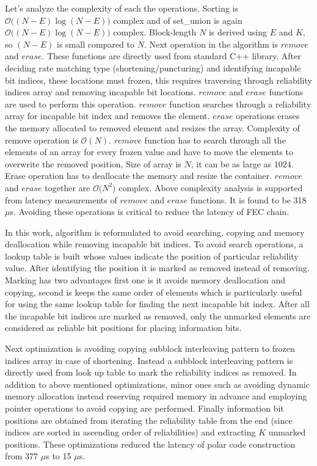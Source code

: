Let's analyze the complexity of each the operations. Sorting is $\mathcal{O}\big((N-E)\log{}(N-E)\big)$ complex and of set\_union is again $\mathcal{O}\big((N-E)\log{}(N-E)\big)$ complex. Block-length $N$ is derived using $E$ and $K$, so $(N-E)$ is small compared to $N$. Next operation in the algorithm is $remove$ and $erase$. These functions are directly used from standard C++ library. After deciding rate matching type (shortening/puncturing) and identifying incapable bit indices, these locations must frozen, this requires traversing through reliability indices array and removing incapable bit locations. $remove$ and $erase$ functions are used to perform this operation. $remove$ function searches through a reliability array for incapable bit index and removes the element. $erase$ operations erases the memory allocated to removed element and resizes the array. Complexity of remove operation is $\mathcal{O}(N)$. $remove$ function has to search through all the elements of an array for every frozen value and have to move the elements to overwrite the removed position, Size of array is $N$, it can be as large as $1024$. Erase operation has to deallocate the memory and resize the container. $remove$ and $erase$ together are $\mathcal{O}\big(N^2\big)$ complex. Above complexity analysis is supported from latency measurements of $remove$ and $erase$ functions. It is found to be 318 $\mu$s. Avoiding these operations is critical to reduce the latency of FEC chain. \newline

In this work, algorithm is reformulated to avoid searching, copying and memory deallocation while removing incapable bit indices. To avoid search operations, a lookup table is built whose values indicate the position of particular reliability value. After identifying the position it is marked as removed instead of removing. Marking has two advantages first one is it avoids memory deallocation and copying, second is keeps the same order of elements which is particularly useful for using the same lookup table for finding the next incapable bit index. After all the incapable bit indices are marked as removed, only the unmarked elements are considered as reliable bit positions for placing information bits.


Next optimization is avoiding copying subblock interleaving pattern to frozen indices array in case of shortening. Instead a subblock interleaving pattern is directly used from look up table to mark the reliability indices as removed. In addition to above mentioned optimizations, minor ones such as avoiding dynamic memory allocation instead reserving required memory in advance and employing pointer operations to avoid copying are performed. Finally information bit positions are obtained from iterating the reliability table from the end (since indices are sorted in ascending order of reliabilities) and extracting $K$ unmarked positions. These optimizations reduced the latency of polar code construction from 377 $\mu$s to 15 $\mu$s.

